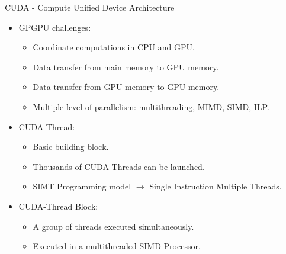 \begin{frame}[t]{CUDA - Compute Unified Device Architecture}
\begin{itemize}
  \item GPGPU challenges:
    \begin{itemize}
      \item Coordinate computations in CPU and GPU.
      \item Data transfer from main memory to GPU memory.
      \item Data transfer from GPU memory to GPU memory.
      \item Multiple level of parallelism: multithreading, MIMD, SIMD, ILP.
    \end{itemize}

  \item CUDA-Thread:
    \begin{itemize}
      \item Basic building block.
      \item Thousands of CUDA-Threads can be launched.
      \item SIMT Programming model $\rightarrow$ Single Instruction Multiple Threads.
    \end{itemize}

  \item CUDA-Thread Block:
    \begin{itemize}
      \item A group of threads executed simultaneously.
      \item Executed in a multithreaded SIMD Processor.
    \end{itemize}
\end{itemize}
\end{frame}

